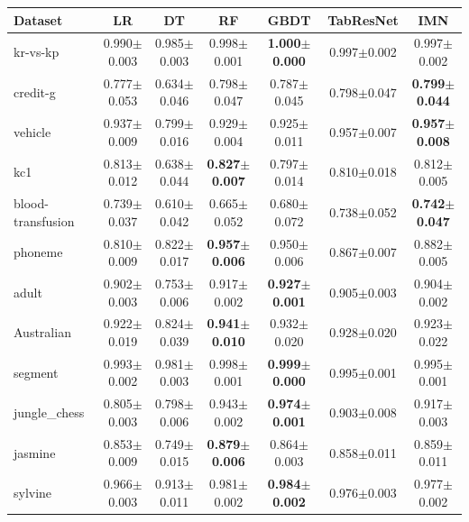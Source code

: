 \begin{tabular}{lcccccc}
\toprule
Dataset & LR & DT & RF & GBDT & TabResNet & IMN \\
\midrule
kr-vs-kp & 0.990{\tiny$\pm$0.003} & 0.985{\tiny$\pm$0.003} & 0.998{\tiny$\pm$0.001} & \textbf{1.000{\tiny$\pm$0.000}} & 0.997{\tiny$\pm$0.002} & 0.997{\tiny$\pm$0.002} \\
credit-g & 0.777{\tiny$\pm$0.053} & 0.634{\tiny$\pm$0.046} & 0.798{\tiny$\pm$0.047} & 0.787{\tiny$\pm$0.045} & 0.798{\tiny$\pm$0.047} & \textbf{0.799{\tiny$\pm$0.044}} \\
vehicle & 0.937{\tiny$\pm$0.009} & 0.799{\tiny$\pm$0.016} & 0.929{\tiny$\pm$0.004} & 0.925{\tiny$\pm$0.011} & 0.957{\tiny$\pm$0.007} & \textbf{0.957{\tiny$\pm$0.008}} \\
kc1 & 0.813{\tiny$\pm$0.012} & 0.638{\tiny$\pm$0.044} & \textbf{0.827{\tiny$\pm$0.007}} & 0.797{\tiny$\pm$0.014} & 0.810{\tiny$\pm$0.018} & 0.812{\tiny$\pm$0.005} \\
blood-transfusion & 0.739{\tiny$\pm$0.037} & 0.610{\tiny$\pm$0.042} & 0.665{\tiny$\pm$0.052} & 0.680{\tiny$\pm$0.072} & 0.738{\tiny$\pm$0.052} & \textbf{0.742{\tiny$\pm$0.047}} \\
phoneme & 0.810{\tiny$\pm$0.009} & 0.822{\tiny$\pm$0.017} & \textbf{0.957{\tiny$\pm$0.006}} & 0.950{\tiny$\pm$0.006} & 0.867{\tiny$\pm$0.007} & 0.882{\tiny$\pm$0.005} \\
adult & 0.902{\tiny$\pm$0.003} & 0.753{\tiny$\pm$0.006} & 0.917{\tiny$\pm$0.002} & \textbf{0.927{\tiny$\pm$0.001}} & 0.905{\tiny$\pm$0.003} & 0.904{\tiny$\pm$0.002} \\
Australian & 0.922{\tiny$\pm$0.019} & 0.824{\tiny$\pm$0.039} & \textbf{0.941{\tiny$\pm$0.010}} & 0.932{\tiny$\pm$0.020} & 0.928{\tiny$\pm$0.020} & 0.923{\tiny$\pm$0.022} \\
segment & 0.993{\tiny$\pm$0.002} & 0.981{\tiny$\pm$0.003} & 0.998{\tiny$\pm$0.001} & \textbf{0.999{\tiny$\pm$0.000}} & 0.995{\tiny$\pm$0.001} & 0.995{\tiny$\pm$0.001} \\
jungle\_chess & 0.805{\tiny$\pm$0.003} & 0.798{\tiny$\pm$0.006} & 0.943{\tiny$\pm$0.002} & \textbf{0.974{\tiny$\pm$0.001}} & 0.903{\tiny$\pm$0.008} & 0.917{\tiny$\pm$0.003} \\
jasmine & 0.853{\tiny$\pm$0.009} & 0.749{\tiny$\pm$0.015} & \textbf{0.879{\tiny$\pm$0.006}} & 0.864{\tiny$\pm$0.003} & 0.858{\tiny$\pm$0.011} & 0.859{\tiny$\pm$0.011} \\
sylvine & 0.966{\tiny$\pm$0.003} & 0.913{\tiny$\pm$0.011} & 0.981{\tiny$\pm$0.002} & \textbf{0.984{\tiny$\pm$0.002}} & 0.976{\tiny$\pm$0.003} & 0.977{\tiny$\pm$0.002} \\
\bottomrule
\end{tabular}
